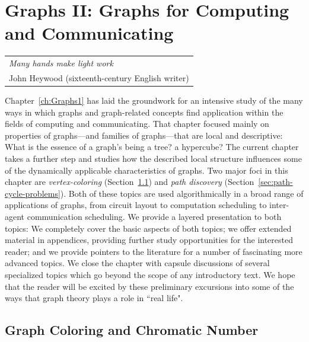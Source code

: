 
\chapter{Graphs II:
Graphs for Computing and Communicating}
\label{ch:Graphs2}

\hfill
\begin{tabular}{l}
{\em Many hands make light work} \\
\hfill {\small John Heywood (sixteenth-century English writer)}
\end{tabular}

\vspace*{.5in}

Chapter~\ref{ch:Graphs1} has laid the groundwork for an intensive study of the many  ways in which graphs and graph-related concepts find application within the fields of computing and communicating.  That chapter focused mainly on properties of graphs---and families of graphs---that are local and descriptive: What is the essence of a graph's being a tree? a hypercube?  The current chapter takes a further step and studies how the described local structure influences some of the dynamically applicable characteristics of graphs.  Two major foci in this chapter are {\em vertex-coloring} (Section~\ref{sec:graph-color}) and {\em path discovery} (Section~\ref{sec:path-cycle-problems}).  Both of these topics are used algorithmically in a broad range of applications of graphs, from circuit layout to computation scheduling to inter-agent communication scheduling.  We provide a layered presentation to both topics: We completely cover the basic aspects of both topics; we offer extended material in appendices, providing further study opportunities for the interested reader; and we provide pointers to the literature for a number of fascinating more advanced topics.  We close the chapter with capsule discussions of several specialized topics which go beyond the scope of any introductory text.  We hope that the reader will be excited by these preliminary excursions into some of the ways that graph theory plays a role in ``real life".



\section{Graph Coloring and Chromatic Number}
\label{sec:graph-color}

